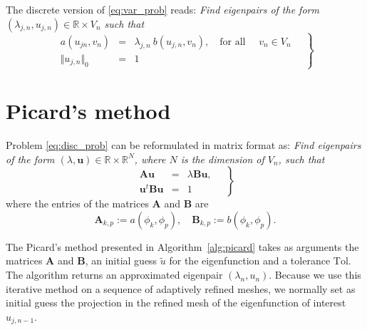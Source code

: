 \documentclass[preprint,12pt]{elsarticle}
\begin{document}

The discrete version of \eqref{eq:var_prob} reads:
\emph{Find eigenpairs of the form $(\lambda_{j,n},u_{j,n})\in
\mathbb{R}\times V_n$
such that}
\begin{equation}
\label{eq:disc_prob}
\left.
\begin{array}{lcl}
a(u_{jn},v_{n})&=& \lambda_{j,n}\ b(u_{j,n},v_{n}),
\quad \text{for all } \quad v_{n}  \in V_n\\
 \Vert u_{j,n} \Vert_{0} &=& 1
\end{array}\quad
\right\}
\end{equation}


\section{Picard's method}\label{sec:picard}

Problem \eqref{eq:disc_prob} can be reformulated in matrix format as:
\emph{Find eigenpairs of the form $(\lambda,\mathbf{u})\in
\mathbb{R}\times \mathbb{R}^N$, where $N$ is the dimension of $V_n$,
such that}
\begin{equation}
\label{eq:disc_prob_mat}
\left.
\begin{array}{lcl}
\mathbf{A} \mathbf{u}&=& \lambda\mathbf{B}\mathbf{u},
\\
\mathbf{u}^t\mathbf{B} \mathbf{u} &=& 1
\end{array}\quad
\right\}
\end{equation}
where the entries of the matrices $\mathbf{A}$ and $\mathbf{B}$ are 
$$
\mathbf{A}_{k,p}:=a(\phi_k,\phi_p),\quad\mathbf{B}_{k,p}:=b(\phi_k,\phi_p).
$$


The Picard's method presented in Algorithm~\ref{alg:picard} takes as arguments the matrices $\mathbf{A}$ and $\mathbf{B}$, an initial guess $\tilde u$ for the eigenfunction and a tolerance $\mathrm{Tol}$. The algorithm returns an approximated eigenpair $(\lambda_{n},u_{n})$.
Because we use this iterative method on a sequence of adaptively refined meshes, we normally set as initial guess
the projection in the refined mesh of the eigenfunction of interest $u_{j,n-1}$.
\end{document}
